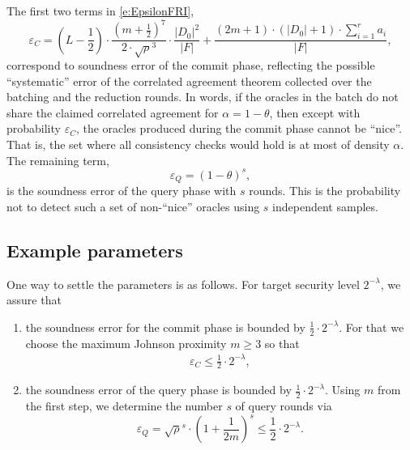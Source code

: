\documentclass[11pt,article,oneside]{memoir}
\theoremstyle{definition}
\theoremstyle{remark}
\begin{document}

The first two terms in \eqref{e:EpsilonFRI},
\[
\varepsilon_C= \left(L-\frac{1}{2}\right) \cdot \frac {\left(m+ \frac{1}{2}\right)^7}{2\cdot\sqrt\rho^3}\cdot \frac{|D_0|^2}{|F|} 
+ \frac{(2m+1)\cdot (|D_0|+1)\cdot \sum_{i=1}^{r} a_i}{|F|},
\] 
correspond to soundness error of the commit phase, reflecting the possible ``systematic'' error of the correlated agreement theorem collected over the batching and the reduction rounds.
In words, 
if the oracles in the batch do not share the claimed correlated agreement for $\alpha = 1-\theta$, then except with probability $\varepsilon_C$,  the oracles produced during the commit phase cannot be ``nice''. 
That is, the set where all consistency checks would hold is at most of density $\alpha$.
The remaining term, 
\[
\varepsilon_Q = (1-\theta)^s,
\]
is the soundness error of the query phase with $s$ rounds.
This is the probability not to detect such a set of non-``nice'' oracles using $s$ independent samples. %







\subsection{Example parameters}

One way to settle the parameters is as follows. 
For target security level $2^{-\lambda}$, we assure that 
\begin{enumerate}
\item
the soundness error for the commit phase is bounded by  $\frac{1}{2}\cdot 2^{-\lambda}$. 
For that we choose the maximum Johnson proximity $m\geq 3$ so that 
\[
\begin{aligned}
\varepsilon_C \leq \frac{1}{2}\cdot 2^{-\lambda},
\end{aligned}
\]
\item
the soundness error of the query phase is bounded by $\frac{1}{2}\cdot 2^{-\lambda}$. 
Using $m$ from the first step, we determine the number $s$ of query rounds via
\[
\varepsilon_Q = \sqrt\rho^s \cdot \left(1 + \frac{1}{2m}\right)^s \leq \frac{1}{2}\cdot 2^{-\lambda}.
\]
\end{enumerate}
\end{document}
